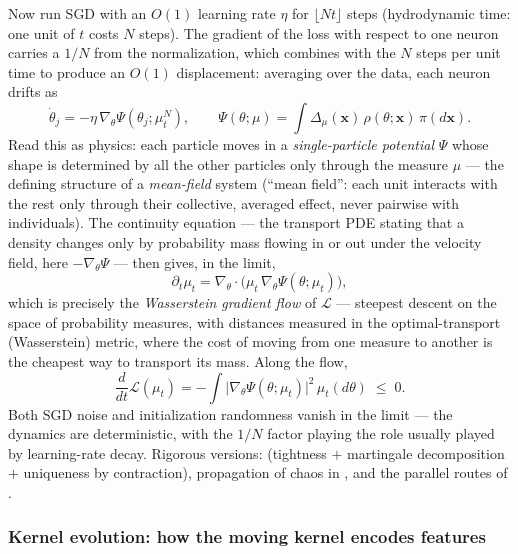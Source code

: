 \documentclass[11pt]{article}
\newcommand{\bv}[1]{\boldsymbol{#1}}
\begin{document}
Now run SGD with an $O(1)$ learning rate $\eta$ for $\lfloor N t \rfloor$
steps (hydrodynamic time: one unit of $t$ costs $N$ steps). The gradient of
the loss with respect to one neuron carries a $1/N$ from the normalization,
which combines with the $N$ steps per unit time to produce an $O(1)$
displacement: averaging over the data, each neuron drifts as
\begin{equation}
  \dot\theta_j = -\eta\, \nabla_\theta \Psi(\theta_j; \mu^N_t),
  \qquad
  \Psi(\theta;\mu) = \int \Delta_\mu(\bv{x})\,
  \rho(\theta;\bv{x})\,\pi(d\bv{x}) .
\end{equation}
Read this as physics: each particle moves in a \emph{single-particle
potential} $\Psi$ whose shape is determined by all the other particles only
through the measure $\mu$ --- the defining structure of a \emph{mean-field}
system (``mean field'': each unit interacts with the rest only through
their collective, averaged effect, never pairwise with individuals). The
continuity equation --- the transport PDE stating that a density changes
only by probability mass flowing in or out under the velocity field, here
$-\nabla_\theta\Psi$ --- then gives, in the limit,
\begin{equation}
  \label{eq:mft}
  \partial_t \mu_t = \nabla_\theta \cdot
  \bigl(\mu_t\, \nabla_\theta \Psi(\theta;\mu_t)\bigr),
\end{equation}
which is precisely the \emph{Wasserstein gradient flow} of $\mathcal{L}$
--- steepest descent on the space of probability measures, with distances
measured in the optimal-transport (Wasserstein) metric, where the cost of
moving from one measure to another is the cheapest way to transport its
mass. Along the flow,
\begin{equation}
  \frac{d}{dt}\mathcal{L}(\mu_t)
  = -\int \bigl|\nabla_\theta \Psi(\theta;\mu_t)\bigr|^2\,\mu_t(d\theta)
  \;\le\; 0 .
\end{equation}
Both SGD noise and initialization randomness vanish in the limit --- the
dynamics are deterministic, with the $1/N$ factor playing the role usually
played by learning-rate decay. Rigorous versions:
\cite[Thm.~20.4, Cor.~20.5]{spiliopoulos2025foundations} (tightness $+$
martingale decomposition $+$ uniqueness by contraction), propagation of
chaos in \cite{sirignano2020mean}, and the parallel routes of
\cite{mei2018mean,chizat2018global,rotskoff2022trainability}.

\subsubsection{Kernel evolution: how the moving kernel encodes features}
\label{sec:kernel-evolution}
\end{document}
